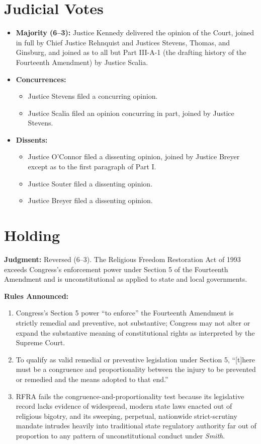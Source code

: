 \documentclass[12pt]{article}
\begin{document}
\section{Judicial Votes}

\begin{itemize}
  \item \textbf{Majority (6--3):} Justice Kennedy delivered the opinion of the Court, joined in full by Chief Justice Rehnquist and Justices Stevens, Thomas, and Ginsburg, and joined as to all but Part III-A-1 (the drafting history of the Fourteenth Amendment) by Justice Scalia.
  \item \textbf{Concurrences:}
  \begin{itemize}
    \item Justice Stevens filed a concurring opinion.
    \item Justice Scalia filed an opinion concurring in part, joined by Justice Stevens.
  \end{itemize}
  \item \textbf{Dissents:}
  \begin{itemize}
    \item Justice O'Connor filed a dissenting opinion, joined by Justice Breyer except as to the first paragraph of Part I.
    \item Justice Souter filed a dissenting opinion.
    \item Justice Breyer filed a dissenting opinion.
  \end{itemize}
\end{itemize}

\section{Holding}

\textbf{Judgment:} Reversed (6--3). The Religious Freedom Restoration Act of 1993 exceeds Congress's enforcement power under Section 5 of the Fourteenth Amendment and is unconstitutional as applied to state and local governments.

\textbf{Rules Announced:}
\begin{enumerate}
  \item Congress's Section 5 power ``to enforce'' the Fourteenth Amendment is strictly remedial and preventive, not substantive; Congress may not alter or expand the substantive meaning of constitutional rights as interpreted by the Supreme Court.
  \item To qualify as valid remedial or preventive legislation under Section 5, ``[t]here must be a congruence and proportionality between the injury to be prevented or remedied and the means adopted to that end.''
  \item RFRA fails the congruence-and-proportionality test because its legislative record lacks evidence of widespread, modern state laws enacted out of religious bigotry, and its sweeping, perpetual, nationwide strict-scrutiny mandate intrudes heavily into traditional state regulatory authority far out of proportion to any pattern of unconstitutional conduct under \textit{Smith}.
\end{enumerate}
\end{document}
